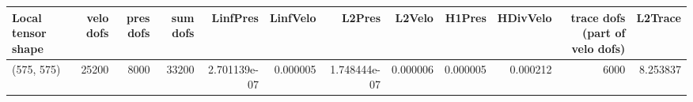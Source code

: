 \begin{tabular}{lrrrrrrrrrrr}
\toprule
Local tensor shape &  velo dofs &  pres dofs &  sum dofs &     LinfPres &  LinfVelo &       L2Pres &   L2Velo &   H1Pres &  HDivVelo &  trace dofs (part of velo dofs) &  L2Trace \\
\midrule
        (575, 575) &      25200 &       8000 &     33200 & 2.701139e-07 &  0.000005 & 1.748444e-07 & 0.000006 & 0.000005 &  0.000212 &                            6000 & 8.253837 \\
\bottomrule
\end{tabular}
